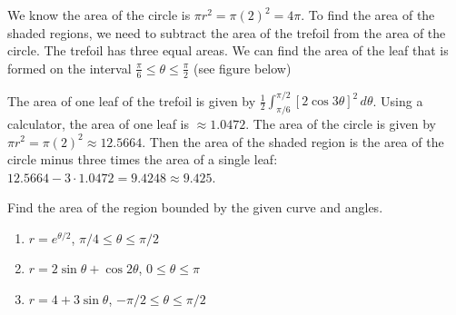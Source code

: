 \begin{Answer}[ref = polar2]
We know the area of the circle is $\pi r^2 = \pi(2)^2 = 4\pi$. To find the 
area of the shaded regions, we need to subtract the area of the trefoil from 
the area of the circle. The trefoil has three equal areas. We can find the 
area of the leaf that is formed on the interval $\frac{\pi}{6} \leq \theta 
\leq \frac{\pi}{2}$ (see figure below)

\begin{center}
\end{center}

The area of one leaf of the trefoil is given by $\frac{1}{2} \int_{\pi/6}^{
\pi/2} \left[2\cos{3\theta} \right]^2\,d\theta$. Using a calculator, the area 
of one leaf is $\approx 1.0472$. The area of the circle is given by $\pi r^2 = 
\pi (2)^2 \approx 12.5664$. Then the area of the shaded region is the area of 
the circle minus three times the area of a single leaf: $12.5664 - 3 \cdot 
1.0472 = 9.4248 \approx 9.425$. 
\end{Answer}

\begin{Exercise}[label = polar4]
Find the area of the region bounded by the given curve and angles. 
\begin{enumerate}
\item $r = e^{\theta/2}$, $\pi/4 \leq \theta \leq \pi/2$
\item $r = 2\sin{\theta} + \cos{2\theta}$, $0 \leq \theta \leq \pi$
\item $r = 4 + 3\sin{\theta}$, $-\pi/2 \leq \theta \leq \pi/2$
\end{enumerate}
\vspace{100mm}
\end{Exercise}

